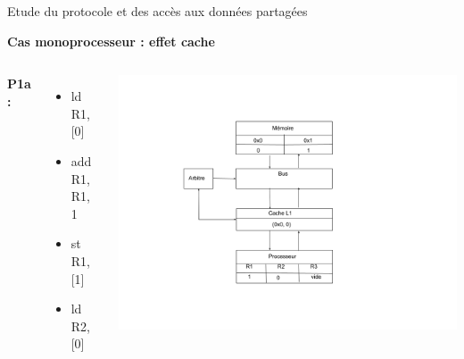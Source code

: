 \documentclass{beamer}
\begin{document}
\begin{frame}{Etude du protocole et des accès aux données partagées}
    \addtocounter{framenumber}{-1}
    \textbf{Cas monoprocesseur : effet cache}
    \begin{columns}[c] %

        \textbf{P1a : }
        \begin{itemize}
            \item ld R1, [0]
            \item add R1, R1, 1
            \item  st R1, [1]
            \item  ld R2, [0]
        \end{itemize}

        \includegraphics[scale=0.28]{f4.png}
        
    \end{columns}
\end{frame}
\end{document}

